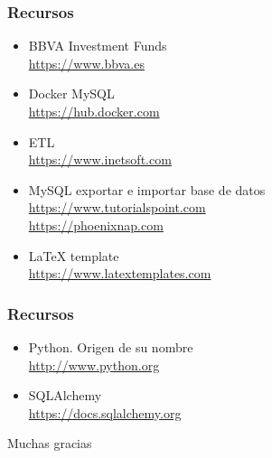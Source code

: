 \documentclass{beamer}
\begin{document}
\begin{frame}
\frametitle{Recursos}
\begin{itemize}
\item BBVA Investment Funds\\
\href{https://www.bbva.es/personas/productos/fondos/por-tipo-de-activo.html}{https://www.bbva.es}
\item Docker MySQL\\
\href{https://hub.docker.com/\_/mysql/}{https://hub.docker.com}
\item ETL\\
\href{https://www.inetsoft.com/business/solutions/etl\_definition\_advantages\_and\_disadvantages/}{https://www.inetsoft.com}
\item MySQL exportar e importar base de datos\\
\href{https://www.tutorialspoint.com/mysql/mysql-database-export.htm}{https://www.tutorialspoint.com}\\
\href{https://phoenixnap.com/kb/import-and-export-mysql-database}{https://phoenixnap.com}
\item LaTeX template\\
\href{https://www.latextemplates.com/template/beamer-presentation}{https://www.latextemplates.com}
\end{itemize}
\end{frame}
\begin{frame}
\frametitle{Recursos}
\begin{itemize}
\item Python. Origen de su nombre\\
\href{http://www.python.org/doc/faq/general/\#why-is-it-called-python}{http://www.python.org}
\item SQLAlchemy\\
\href{https://docs.sqlalchemy.org/en/14/core/engines.html}{https://docs.sqlalchemy.org}
\end{itemize}
\end{frame}



\begin{frame}
\Huge{\centerline{Muchas gracias}}
\end{frame}

\end{document}

